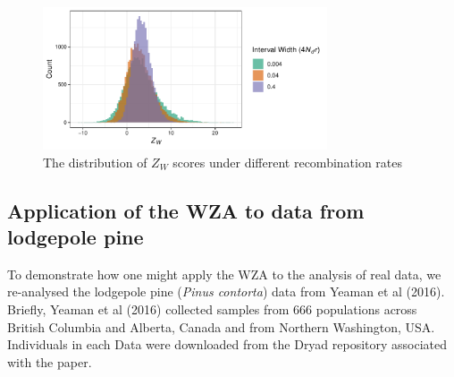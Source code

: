 \documentclass[11pt,twoside,lineno]{GSA_format}
\begin{document}
\begin{figure}[H]
  \includegraphics[width=0.75\textwidth,height=0.5\textheight,keepaspectratio]{Plots/recombinationRateHistogram.pdf} 
  \caption{The distribution of $Z_W$ scores under different recombination rates }

  \label{fig:WZA_Recombination}
\end{figure}

 
\subsection{Application of the WZA to data from lodgepole pine}

To demonstrate how one might apply the WZA to the analysis of real data, we re-analysed the lodgepole pine (\textit{Pinus contorta}) data from Yeaman et al (2016). Briefly, Yeaman et al (2016) collected samples from 666 populations across British Columbia and Alberta, Canada and from Northern Washington, USA. Individuals in each 
Data were downloaded from the Dryad repository associated with the paper. 
\end{document}
